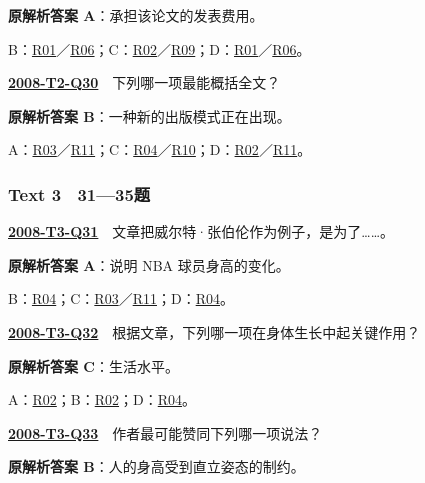 \documentclass[11pt,a4paper]{article}
\begin{document}
\noindent\textbf{原解析答案 A}：承担该论文的发表费用。\par\nopagebreak
\noindent B：\hyperref[cat-R01]{R01}／\hyperref[cat-R06]{R06}；C：\hyperref[cat-R02]{R02}／\hyperref[cat-R09]{R09}；D：\hyperref[cat-R01]{R01}／\hyperref[cat-R06]{R06}。\par\smallskip
{}\label{idx-2008-T2-Q30}\noindent\textbf{\href{https://zj139.github.io/math-notes/english/218b3a79bc4e7687dd26be0c/\#q30}{2008-T2-Q30}}　下列哪一项最能概括全文？\par\nopagebreak
\noindent\textbf{原解析答案 B}：一种新的出版模式正在出现。\par\nopagebreak
\noindent A：\hyperref[cat-R03]{R03}／\hyperref[cat-R11]{R11}；C：\hyperref[cat-R04]{R04}／\hyperref[cat-R10]{R10}；D：\hyperref[cat-R02]{R02}／\hyperref[cat-R11]{R11}。\par\smallskip
\clearpage
{}\subsubsection{Text 3　31—35题}
\label{idx-2008-T3-Q31}\noindent\textbf{\href{https://zj139.github.io/math-notes/english/a46a979d6c43850d2b57732f/\#q31}{2008-T3-Q31}}　文章把威尔特·张伯伦作为例子，是为了……。\par\nopagebreak
\noindent\textbf{原解析答案 A}：说明 NBA 球员身高的变化。\par\nopagebreak
\noindent B：\hyperref[cat-R04]{R04}；C：\hyperref[cat-R03]{R03}／\hyperref[cat-R11]{R11}；D：\hyperref[cat-R04]{R04}。\par\smallskip
{}\label{idx-2008-T3-Q32}\noindent\textbf{\href{https://zj139.github.io/math-notes/english/a46a979d6c43850d2b57732f/\#q32}{2008-T3-Q32}}　根据文章，下列哪一项在身体生长中起关键作用？\par\nopagebreak
\noindent\textbf{原解析答案 C}：生活水平。\par\nopagebreak
\noindent A：\hyperref[cat-R02]{R02}；B：\hyperref[cat-R02]{R02}；D：\hyperref[cat-R04]{R04}。\par\smallskip
{}\label{idx-2008-T3-Q33}\noindent\textbf{\href{https://zj139.github.io/math-notes/english/a46a979d6c43850d2b57732f/\#q33}{2008-T3-Q33}}　作者最可能赞同下列哪一项说法？\par\nopagebreak
\noindent\textbf{原解析答案 B}：人的身高受到直立姿态的制约。\par\nopagebreak
\end{document}
